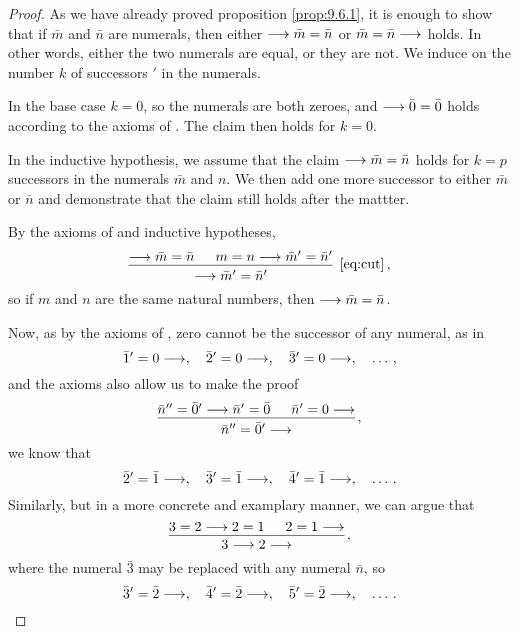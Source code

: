 \documentclass[11pt,a4paper]{article}
\begin{document}
\begin{proof}
    As we have already proved proposition \ref{prop:9.6.1},
    it is enough to show that if \(\bar m\) and \(\bar n\) are
    numerals, then either \(\longrightarrow \bar m = \bar n\) or \(\bar m = \bar n\longrightarrow\) holds.
    In other words, either the two numerals are equal, or they are not.
    We induce on the number \(k\) of successors \(\prime\) in the numerals.

    In the base case \(k=0\), so the numerals are both zeroes,
    and \(\longrightarrow\bar0=\bar0\) holds according to the axioms of \PA{}.
    The claim then holds for \(k=0\).

    In the inductive hypothesis, we assume that the claim \(\longrightarrow\bar m=\bar n\)
    holds for \(k = p\) successors in the numerals \(\bar m\) and \(n\).
    We then add one more successor to either \(\bar m\) or \(\bar n\)
    and demonstrate that the claim still holds after the mattter.

    By the axioms of \PA{} and inductive hypotheses,
    \begin{equation*}
        \begin{prooftree}
            \hypo{\seq\bar m=\bar n}
            \hypo{m = n\seq\bar m'=\bar n'}
            \infer2[\eqref{eq:cut}]{\seq\bar m'=\bar n'}
        \end{prooftree}\,,
    \end{equation*}
    so if \(m\) and \(n\) are the same natural numbers,
    then \(\longrightarrow\bar m=\bar n\).

    Now, as by the axioms of \PA{}, zero cannot be the successor
    of any numeral, as in
    \begin{equation*}
        \bar1'=0\longrightarrow,\quad
        \bar2'=0\longrightarrow,\quad
        \bar3'=0\longrightarrow,\quad
        \ldots\,,
    \end{equation*}
    and the axioms also allow us to make the proof
    \begin{equation*}
        \begin{prooftree}
            \hypo{\bar n''=\bar 0'\seq \bar n' = \bar0}
            \hypo{\bar n'=0\seq}
            \infer2{\bar n''=\bar 0'\seq}
        \end{prooftree}\,,
    \end{equation*}
    we know that
    \begin{equation*}
        \bar2'=\bar1\longrightarrow,\quad
        \bar3'=\bar1\longrightarrow,\quad
        \bar4'=\bar1\longrightarrow,\quad
        \ldots\,.
    \end{equation*}
    Similarly, but in a more concrete and examplary manner,
    we can argue that
    \begin{equation*}
        \begin{prooftree}
            \hypo{3 = 2 \seq 2 = 1}
            \hypo{2 = 1 \seq}
            \infer2{3\seq 2\seq}
        \end{prooftree}\,,
    \end{equation*}
    where the numeral \(\bar3\) may be replaced with any numeral \(\bar n\), so
    \begin{equation*}
        \bar3'=\bar2\longrightarrow,\quad
        \bar4'=\bar2\longrightarrow,\quad
        \bar5'=\bar2\longrightarrow,\quad
        \ldots\,.
    \end{equation*}


\end{proof}
\end{document}
